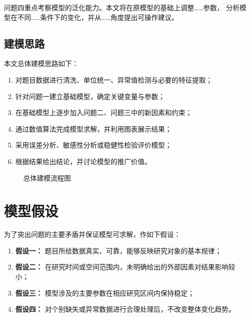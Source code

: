 \documentclass[UTF8,fontset=windows,a4paper,12pt]{ctexart}
\begin{document}
问题四重点考察模型的泛化能力。本文将在原模型的基础上调整……参数，
分析模型在不同……条件下的变化，并从……角度提出可操作建议。

\subsection{建模思路}

本文总体建模思路如下：
\begin{enumerate}
  \item 对题目数据进行清洗、单位统一、异常值检测与必要的特征提取；
  \item 针对问题一建立基础模型，确定关键变量与参数；
  \item 在基础模型上逐步加入问题二、问题三中的新因素和约束；
  \item 通过数值算法完成模型求解，并利用图表展示结果；
  \item 采用误差分析、敏感性分析或稳健性检验评价模型；
  \item 根据结果给出结论，并讨论模型的推广价值。
\end{enumerate}

\begin{figure}[H]
  \centering
  \fbox{\rule{0pt}{5.0cm}\rule{0.86\textwidth}{0pt}}
  \caption{总体建模流程图}
  \label{fig:workflow}
\end{figure}

\section{模型假设}

为了突出问题的主要矛盾并保证模型可求解，作如下假设：

\begin{enumerate}
  \item \textbf{假设一：} 题目所给数据真实、可靠，能够反映研究对象的基本规律；
  \item \textbf{假设二：} 在研究时间或空间范围内，未明确给出的外部因素对结果影响较小；
  \item \textbf{假设三：} 模型涉及的主要参数在相应研究区间内保持稳定；
  \item \textbf{假设四：} 对个别缺失或异常数据进行合理处理后，不改变整体变化趋势。
\end{enumerate}

\end{document}
